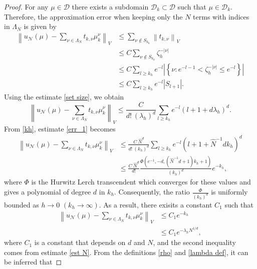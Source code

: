 \documentclass[12pt]{article}
\theoremstyle{remark}
\theoremstyle{definition}
\numberwithin{equation}{section}
\begin{document}
\begin{proof}
    For any $\mu \in \mathcal{D}$ there exists a subdomain $\mathcal{D}_k \subset \mathcal{D}$ such that $\mu \in \mathcal{D}_k$. Therefore, the approximation error when keeping only the $N$ terms with indices in $\Lambda_N$ is given by 
    \begin{align}
          \left\|u_{\mathcal{N}}(\mu)-\sum_{\nu \in \Lambda_N} t_{k,\nu} \mu_k^\nu \right\|_V 
        & \leq \sum_{\nu \notin S_{k_h}} \left\|t_{k,\nu} \right\|_V \\
        & \leq C\sum_{\nu \notin S_{k_h}} \zeta_h^{-|\nu|} \\
        & \leq C \sum_{l \geq k_h } e^{-l} \left|\left\{\nu: e^{-l-1} < \zeta_h^{-|\nu|} \leq e^{-l}\right\}\right|\\ %
        & \leq C \sum_{l \geq k_h } e^{-l} \left|S_{l+1}\right|.
    \end{align}
    Using the estimate \eqref{set size}, we obtain
    \begin{equation}
          \left\|u_{\mathcal{N}}(\mu)-\sum_{\nu \in \Lambda_N} t_{k,\nu} \mu_k^\nu \right\|_V  \leq \frac{C}{d! \ (\lambda_h)^d} \sum_{l \geq k_h } e^{-l} \left(l+1+ d\lambda_h\right)^d.
        \label{err_1}
    \end{equation}
    From \eqref{kh}, estimate \eqref{err_1} becomes
    \begin{align}
          \left\|u_{\mathcal{N}}(\mu)-\sum_{\nu \in \Lambda_N} t_{k,\nu} \mu_k^\nu \right\|_V &  \leq \frac{C \ \hat{N}^d}{d! \  (k_h)^d} \sum_{l \geq k_h } e^{-l} \left(l+1+\hat{N}^{-1}d k_h\right)^d\\
        & \leq \frac{C \ \hat{N}^d}{d!} \frac{\Phi\left(e^{-1},-d,(\hat{N}^{-1}d+1)k_h+1\right)}{(k_h)^d} e^{-k_h},
    \end{align}
    where $\Phi$ is the Hurwitz Lerch transcendent which converges for these values and gives a polynomial of degree $d$ in $k_h$. Consequently, the ratio $\frac{\Phi}{(k_h)^d}$ is uniformly bounded as $h\rightarrow 0$ $\left(k_h \rightarrow \infty\right)$. As a result, there exisits a constant $C_1$ such that
    \begin{align}
          \left\|u_{\mathcal{N}}(\mu)-\sum_{\nu \in \Lambda_N} t_{k,\nu} \mu_k^\nu \right\|_V &\leq C_1 e^{-k_h}\\
        &\leq C_1 e^{-\lambda_hN^{1/d}},
    \end{align}
    where $C_1$ is a constant that depends on $d$ and $N$, and the second inequality comes from estimate \eqref{est N}. From the definitions \eqref{rho} and \eqref{lambda def}, it can be inferred that 

\end{proof}
\end{document}
